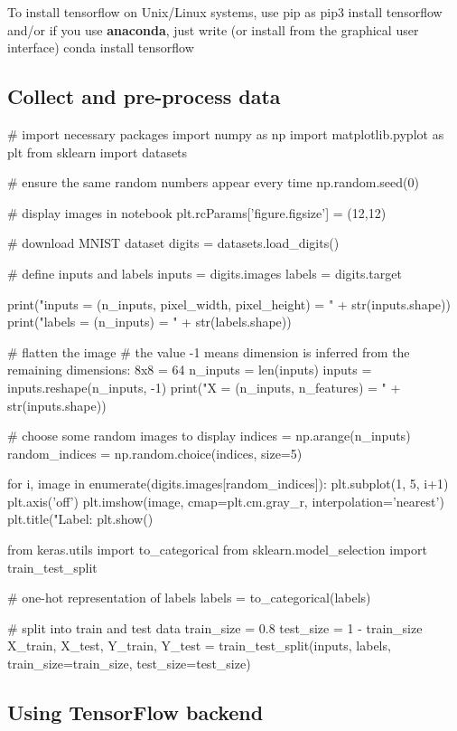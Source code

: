 \documentclass[%
oneside,                 %
final,                   %
10pt]{article}
\begin{document}
To install tensorflow on Unix/Linux systems, use pip as
\bpycod
pip3 install tensorflow
\epycod
and/or if you use \textbf{anaconda}, just write (or install from the graphical user interface)
\bpycod
conda install tensorflow
\epycod

\subsection{Collect and pre-process data}

\bpycod
# import necessary packages
import numpy as np
import matplotlib.pyplot as plt
from sklearn import datasets


# ensure the same random numbers appear every time
np.random.seed(0)

# display images in notebook
plt.rcParams['figure.figsize'] = (12,12)


# download MNIST dataset
digits = datasets.load_digits()

# define inputs and labels
inputs = digits.images
labels = digits.target

print("inputs = (n_inputs, pixel_width, pixel_height) = " + str(inputs.shape))
print("labels = (n_inputs) = " + str(labels.shape))


# flatten the image
# the value -1 means dimension is inferred from the remaining dimensions: 8x8 = 64
n_inputs = len(inputs)
inputs = inputs.reshape(n_inputs, -1)
print("X = (n_inputs, n_features) = " + str(inputs.shape))


# choose some random images to display
indices = np.arange(n_inputs)
random_indices = np.random.choice(indices, size=5)

for i, image in enumerate(digits.images[random_indices]):
    plt.subplot(1, 5, i+1)
    plt.axis('off')
    plt.imshow(image, cmap=plt.cm.gray_r, interpolation='nearest')
    plt.title("Label: %
plt.show()
\epycod

\bpycod
from keras.utils import to_categorical
from sklearn.model_selection import train_test_split

# one-hot representation of labels
labels = to_categorical(labels)

# split into train and test data
train_size = 0.8
test_size = 1 - train_size
X_train, X_test, Y_train, Y_test = train_test_split(inputs, labels, train_size=train_size,
                                                    test_size=test_size)
\epycod

\subsection{Using TensorFlow backend}
\end{document}
